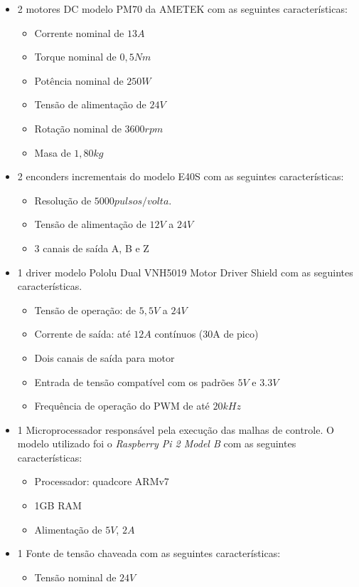 \documentclass[]{politex}
\begin{document}
\begin{itemize}
\item 2 motores DC modelo PM70 da AMETEK com as seguintes características:
\begin{itemize}
\item Corrente nominal de $13A$ 
\item Torque nominal de $0{,}5Nm$
\item Potência nominal de $250W$
\item Tensão de alimentação de $24V$
\item Rotação nominal de $3600 rpm$
\item Masa de $1{,}80 kg$ 
\end{itemize}
\item  2 enconders incrementais do modelo E40S com as seguintes características:
\begin{itemize}
\item Resolução de $5000 pulsos/volta$.
\item Tensão de alimentação de $12V$ a $24V$
\item 3 canais de saída A, B e Z
\end{itemize}
\item 1 driver modelo Pololu Dual VNH5019 Motor Driver Shield com as seguintes características.
\begin{itemize}
\item Tensão de operação: de $5{,}5V$ a $24V$
\item Corrente de saída: até $12A$ contínuos (30A de pico)
\item Dois canais de saída para motor
\item Entrada de tensão compatível com os padrões $5V$ e $3.3V$
\item Frequência de operação do PWM de até $20kHz$
\end{itemize}
\item 1 Microprocessador responsável pela execução das malhas de controle. O modelo utilizado foi o \textit{Raspberry Pi 2 Model B} com as seguintes características:
\begin{itemize}
\item Processador: quadcore ARMv7
\item 1GB RAM
\item Alimentação de $5V$, $2A$
\end{itemize}
\item 1 Fonte de tensão chaveada com as seguintes características:
\begin{itemize}
\item Tensão nominal de $24V$

\end{itemize}
\end{itemize}
\end{document}
